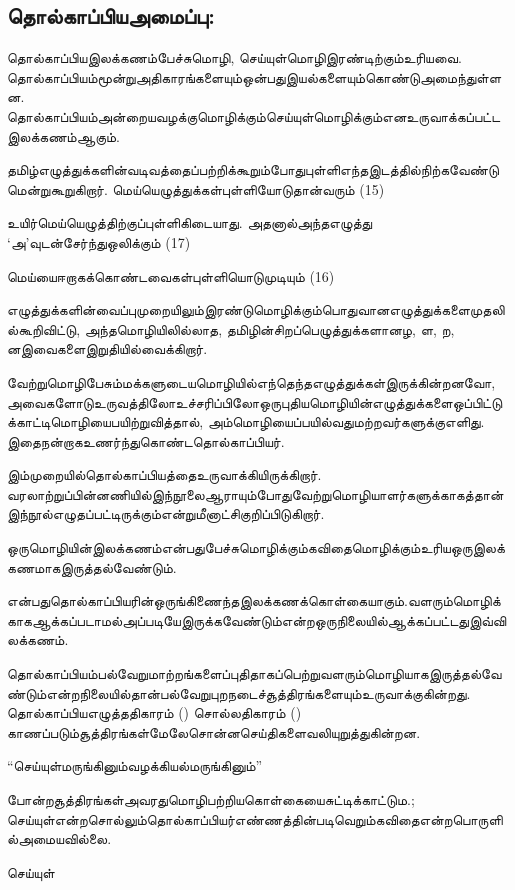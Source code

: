 \subsection{தொல்காப்பியஅமைப்பு:}

தொல்காப்பியஇலக்கணம்பேச்சுமொழி, செய்யுள்மொழிஇரண்டிற்கும்உரியவை. தொல்காப்பியம்மூன்றுஅதிகாரங்களையும்ஒன்பதுஇயல்களையும்கொண்டுஅமைந்துள்ளன. தொல்காப்பியம்அன்றையவழக்குமொழிக்கும்செய்யுள்மொழிக்கும்எனஉருவாக்கப்பட்டஇலக்கணம்ஆகும்.

தமிழ்எழுத்துக்களின்வடிவத்தைப்பற்றிக்கூறும்போதுபுள்ளிஎந்தஇடத்தில்நிற்கவேண்டுமென்றுகூறுகிறார். மெய்யெழுத்துக்கள்புள்ளியோடுதான்வரும் (15) 

உயிர்மெய்யெழுத்திற்குப்புள்ளிகிடையாது. அதனால்அந்தஎழுத்து ‘அ’வுடன்சேர்ந்துஒலிக்கும் (17)

மெய்யைஈறாகக்கொண்டவைகள்புள்ளியொடுமுடியும் (16) 

எழுத்துக்களின்வைப்புமுறையிலும்இரண்டுமொழிக்கும்பொதுவானஎழுத்துக்களைமுதலில்கூறிவிட்டு, அந்தமொழியிலில்லாத, தமிழின்சிறப்பெழுத்துக்களானழ, ள, ற, னஇவைகளைஇறுதியில்வைக்கிறார்.

வேற்றுமொழிபேசும்மக்களுடையமொழியில்எந்தெந்தஎழுத்துக்கள்இருக்கின்றனவோ, அவைகளோடுஉருவத்திலோஉச்சரிப்பிலோஒருபுதியமொழியின்எழுத்துக்களைஒப்பிட்டுக்காட்டிமொழியைபயிற்றுவித்தால், அம்மொழியைப்பயில்வதுமற்றவர்களுக்குஎளிது. இதைநன்றாகஉணர்ந்துகொண்டதொல்காப்பியர்.

இம்முறையில்தொல்காப்பியத்தைஉருவாக்கியிருக்கிறார். வரலாற்றுப்பின்னணியில்இந்நூலைஆராயும்போதுவேற்றுமொழியாளர்களுக்காகத்தான்இந்நூல்எழுதப்பட்டிருக்கும்என்றுமீனாட்சிகுறிப்பிடுகிறார்.

ஒருமொழியின்இலக்கணம்என்பதுபேச்சுமொழிக்கும்கவிதைமொழிக்கும்உரியஒருஇலக்கணமாகஇருத்தல்வேண்டும்.

 என்பதுதொல்காப்பியரின்ஒருங்கிணைந்தஇலக்கணக்கொள்கையாகும்.வளரும்மொழிக்காகஆக்கப்படாமல்அப்படியேஇருக்கவேண்டும்என்றஒருநிலையில்ஆக்கப்பட்டதுஇவ்விலக்கணம்.

தொல்காப்பியம்பல்வேறுமாற்றங்களைப்புதிதாகப்பெற்றுவளரும்மொழியாகஇருத்தல்வேண்டும்என்றநிலையில்தான்பல்வேறுபுறநடைச்சூத்திரங்களையும்உருவாக்குகின்றது. தொல்காப்பியஎழுத்ததிகாரம் () சொல்லதிகாரம் () காணப்படும்சூத்திரங்கள்மேலேசொன்னசெய்திகளைவலியுறுத்துகின்றன.

\begin{center}
“செய்யுள்மருங்கினும்வழக்கியல்மருங்கினும்”
\end{center}

போன்றசூத்திரங்கள்அவரதுமொழிபற்றியகொள்கையைசுட்டிக்காட்டும.; செய்யுள்என்றசொல்லும்தொல்காப்பியர்எண்ணத்தின்படிவெறும்கவிதைஎன்றபொருளில்அமையவில்லை.

\begin{center}
செய்யுள்
\end{center}

